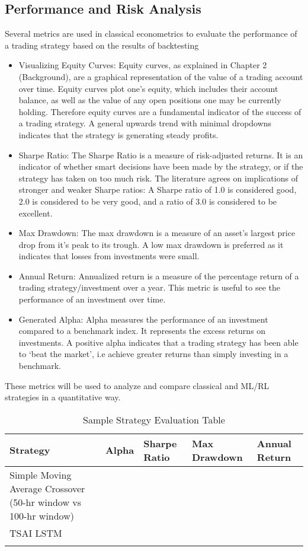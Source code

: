 \subsection{Performance and Risk Analysis}
Several metrics are used in classical econometrics to evaluate the performance of a trading strategy based on the results of backtesting
\begin{itemize}
    \item Visualizing Equity Curves: Equity curves, as explained in Chapter 2 (Background), are a graphical representation of the value of a trading account over time. Equity curves plot one's equity, which includes their account balance, as well as the value of any open positions one may be currently holding. Therefore equity curves are a fundamental indicator of the success of a trading strategy. A general upwards trend with minimal dropdowns indicates that the strategy is generating steady profits.
    \item Sharpe Ratio: The Sharpe Ratio is a measure of risk-adjusted returns. It is an indicator of whether smart decisions have been made by the strategy, or if the strategy has taken on too much risk. The literature agrees on implications of stronger and weaker Sharpe ratios: A Sharpe ratio of 1.0 is considered good, 2.0 is considered to be very good, and a ratio of 3.0 is considered to be excellent.
    \item Max Drawdown: The max drawdown is a measure of an asset's largest price drop from it's peak to its trough. A low max drawdown is preferred as it indicates that losses from investments were small.
    \item Annual Return: Annualized return is a measure of the percentage return of a trading strategy/investment over a year. This metric is useful to see the performance of an investment over time.
    \item Generated Alpha: Alpha measures the performance of an investment compared to a benchmark index. It represents the excess returns on investments. A positive alpha indicates that a trading strategy has been able to `beat the market', i.e achieve greater returns than simply investing in a benchmark.
\end{itemize}
These metrics will be used to analyze and compare classical and ML/RL strategies in a quantitative way.

\begin{table}[h]
    \centering
    \begin{tabular}{|p{6cm}|p{1.5cm}|p{2cm}|p{2.5cm}|p{2cm}|}
    \hline
        \textbf{Strategy} & \textbf{Alpha} & \textbf{Sharpe Ratio} & \textbf{Max Drawdown} & \textbf{Annual Return} \\
        \hline
        Simple Moving Average Crossover (50-hr window vs 100-hr window) & & & & \\
         \hline
        TSAI LSTM & & & & \\
         \hline
         & & & &\\
         \hline
    \end{tabular}
    \caption{Sample Strategy Evaluation Table}
    \label{tab:my_label}
\end{table}

